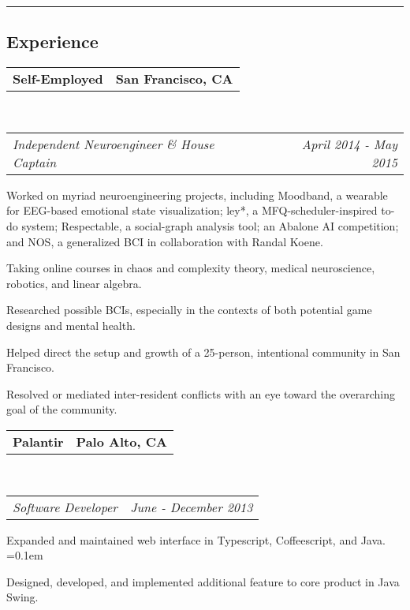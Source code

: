 \documentclass[10pt,letterpaper]{article}
\makeatletter
\newenvironment{indentsection}[1]%
{\begin{list}{}%
	{\setlength{\leftmargin}{#1}}%
	\item[]%
}
{\end{list}}
\newcommand{\headerrow}[2]
{\begin{tabular*}{\linewidth}{l@{\extracolsep{\fill}}r}
	#1 &
	#2 \\
	
\end{tabular*}}
\makeatother
\begin{document}
\vspace{-0.5em}
\hrule
\vspace{-0.5em}
\subsection*{Experience}
\begin{indentsection}{\parindent}
	\headerrow
		{\textbf{Self-Employed}}
		{\textbf{San Francisco, CA}}
	\\
	\headerrow
		{\emph{Independent Neuroengineer \& House Captain}}
		{\emph{April 2014 - May 2015}}
\vspace{-2em}
	\begin{itemize*}
		\item Worked on myriad neuroengineering projects, including Moodband, a wearable for EEG-based emotional state visualization; ley*, a MFQ-scheduler-inspired to-do system; Respectable, a social-graph analysis tool; an Abalone AI competition; and NOS, a generalized BCI in collaboration with Randal Koene.
		\item Taking online courses in chaos and complexity theory, medical neuroscience, robotics, and linear algebra.
		\item Researched possible BCIs, especially in the contexts of both potential game designs and mental health.
		\item Helped direct the setup and growth of a 25-person,  intentional community in San Francisco.
		\item Resolved or mediated inter-resident conflicts with an eye toward the overarching goal of the community.
	\end{itemize*}
\vspace{-0.1em}
	\headerrow
		{\textbf{Palantir}}
		{\textbf{Palo Alto, CA}}
	\\
	\headerrow
		{\emph{Software Developer}}
		{\emph{June - December 2013}}
\vspace{-2em}
	\begin{itemize*}
		\item Expanded and maintained web interface in Typescript, Coffeescript, and Java.
		\parskip=0.1em
		\item Designed, developed, and implemented additional feature to core product in Java Swing.
	\end{itemize*}


\end{indentsection}
\end{document}
